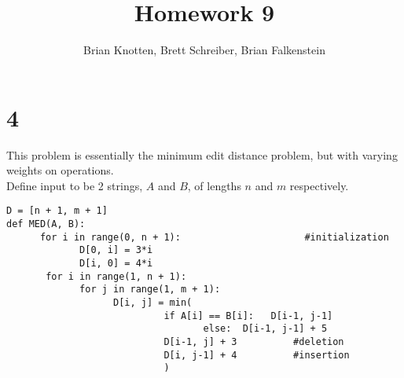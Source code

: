 \documentclass[letterpaper,notitlepage,twoside]{article}
\begin{document}
\title{Homework 9}
\author{Brian Knotten, Brett Schreiber, Brian Falkenstein}
\maketitle

\section*{4}
This problem is essentially the minimum edit distance problem, but with varying weights on operations. \\
Define input to be 2 strings, $A$ and $B$, of lengths $n$ and $m$ respectively.
\begin{verbatim}
D = [n + 1, m + 1]
def MED(A, B):
      for i in range(0, n + 1):                      #initialization 
             D[0, i] = 3*i
             D[i, 0] = 4*i
       for i in range(1, n + 1):
             for j in range(1, m + 1):
                   D[i, j] = min(
                            if A[i] == B[i]:   D[i-1, j-1]
                                   else:  D[i-1, j-1] + 5
                            D[i-1, j] + 3          #deletion
                            D[i, j-1] + 4          #insertion
                            )
\end{verbatim}
\end{document}
